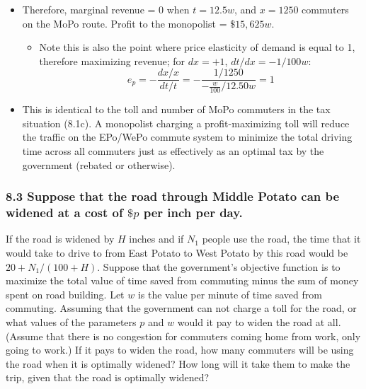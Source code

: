 \documentclass[]{article}
\providecommand{\tightlist}{%
  \setlength{\itemsep}{0pt}\setlength{\parskip}{0pt}}
\begin{document}
\begin{itemize}
\tightlist
\item
  Therefore, marginal revenue = 0 when \(t = 12.5w\), and \(x = 1250\)
  commuters on the MoPo route. Profit to the monopolist = \(\$15,625w\).

  \begin{itemize}
  \tightlist
  \item
    Note this is also the point where price elasticity of demand is
    equal to 1, therefore maximizing revenue; for \(dx = +1\),
    \(dt/dx = -1/100w\):
    \[e_p = -\frac{dx/x}{dt/t} = -\frac{1/1250}{-\frac{w}{100}/12.50w} = 1\]
  \end{itemize}
\item
  This is identical to the toll and number of MoPo commuters in the tax
  situation (8.1c). A monopolist charging a profit-maximizing toll will
  reduce the traffic on the EPo/WePo commute system to minimize the
  total driving time across all commuters just as effectively as an
  optimal tax by the government (rebated or otherwise).
\end{itemize}

\subsubsection{\texorpdfstring{8.3 Suppose that the road through Middle
Potato can be widened at a cost of \(\$p\) per inch per
day.}{8.3 Suppose that the road through Middle Potato can be widened at a cost of \textbackslash{}\$p per inch per day.}}\label{suppose-that-the-road-through-middle-potato-can-be-widened-at-a-cost-of-p-per-inch-per-day.}

If the road is widened by \(H\) inches and if \(N_1\) people use the
road, the time that it would take to drive to from East Potato to West
Potato by this road would be \(20 + N_1/(100 + H)\). Suppose that the
government's objective function is to maximize the total value of time
saved from commuting minus the sum of money spent on road building. Let
\(w\) is the value per minute of time saved from commuting. Assuming
that the government can not charge a toll for the road, or what values
of the parameters \(p\) and \(w\) would it pay to widen the road at all.
(Assume that there is no congestion for commuters coming home from work,
only going to work.) If it pays to widen the road, how many commuters
will be using the road when it is optimally widened? How long will it
take them to make the trip, given that the road is optimally widened?
\end{document}
